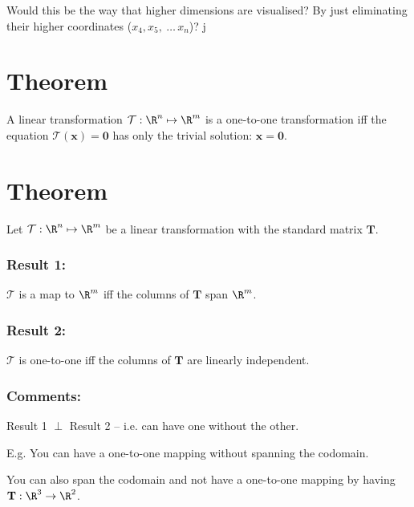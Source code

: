 \documentclass{article}
\begin{document}
%
\qanda
{Would this be the way that higher dimensions are visualised? By just
eliminating their higher coordinates ($ x_4,x_5,\ \ldots \, x_{n} $)? }
{j} 

%
\clearpage
\section{Theorem} 
A linear transformation $ \mathcal{T}: \R^{n} \mapsto \R^{m}  $ is a one-to-one
transformation iff the equation $ \mathcal{T}(\mathbf{x})= \mathbf{0} $ has only
the trivial solution: $ \mathbf{x}=\mathbf{0} $.

\section{Theorem} 
Let $ \mathcal{T}: \R^{n} \mapsto \R^{m} $ be a linear transformation with the
standard matrix $ \mathbf{T} $. 

\subsubsection{Result 1:}

$ \mathcal{T} $ is a map to $ \R^{m} $ iff the columns of $ \mathbf{T} $ 
span $ \R^{m} $. 

\subsubsection{Result 2:}

$ \mathcal{T} $ is one-to-one iff the columns of $ \mathbf{T} $ are linearly
independent. 

\subsubsection{Comments:} 

Result 1 $ \perp $ Result 2 -- i.e. can have one without the other.

E.g. You can have a one-to-one mapping without spanning the codomain.

You can also span the codomain and not have a one-to-one mapping by having $
\mathbf{T} : \R^{3}\rightarrow \R^{2} $.
\end{document}
